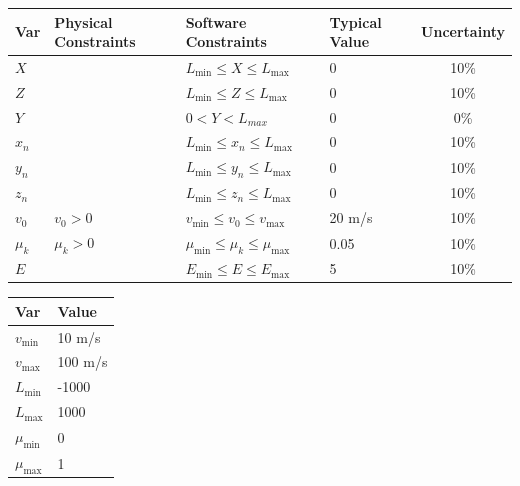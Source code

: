 \documentclass[12pt]{article}
\begin{document}
	\begin{table}[!h]
		\caption{Input Variables} \label{TblInputVar}
		\renewcommand{\arraystretch}{1.2}
		\noindent \begin{longtable*}{l l l l c} 
			\toprule
			\textbf{Var} & \textbf{Physical Constraints} & \textbf{Software Constraints} &
			\textbf{Typical Value} & \textbf{Uncertainty}\\
			\midrule 
			$X$ &  & $L_{\text{min}} \leq X \leq L_{\text{max}}$ & 0 & 10\%
			\\
			$Z$ &  & $L_{\text{min}} \leq Z \leq L_{\text{max}}$ & 0 & 10\%
			\\
			$Y$ &  & $0 < Y < L_{max}$ & 0 & 0\%
			\\
			$x_{n}$ &  & $L_{\text{min}} \leq x_{n} \leq L_{\text{max}}$ & 0 & 10\%
			\\
			$y_{n}$ &  & $L_{\text{min}} \leq y_{n} \leq L_{\text{max}}$ & 0 & 10\%
			\\
			$z_{n}$ &  & $L_{\text{min}} \leq z_{n} \leq L_{\text{max}}$ & 0 & 10\%
			\\
			$v_{0}$ & $v_{0} > 0$ & $v_{\text{min}} \leq v_{0} \leq v_{\text{max}}$ & 20 m/s & 10\%
			\\
			$\mu_{k}$ & $\mu_{k} > 0$ & $\mu_{\text{min}} \leq \mu_{k} \leq \mu_{\text{max}}$ & 0.05 & 10\%
			\\
			$E$ &  & $E_{\text{min}} \leq E \leq E_{\text{max}}$ & 5 & 10\%
			\\
			\bottomrule
		\end{longtable*}
	\end{table}
	
	\noindent 
	
	\begin{table}[!h]
		\caption{Specification Parameter Values} \label{TblSpecParams}
		\renewcommand{\arraystretch}{1.2}
		\noindent \begin{longtable*}{l l} 
			\toprule
			\textbf{Var} & \textbf{Value} \\
			\midrule 
			$v_\text{min}$ & 10 m/s\\
			$v_\text{max}$ & 100 m/s\\
			$L_\text{min}$ & -1000\\
			$L_\text{max}$ & 1000\\
			$\mu_\text{min}$ & 0\\
			$\mu_\text{max}$ & 1\\
			\bottomrule
		\end{longtable*}
	\end{table}
	
\end{document}
